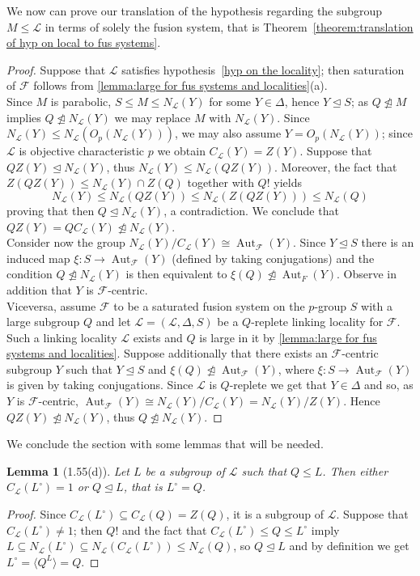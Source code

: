 \documentclass{amsart}
\numberwithin{equation}{section}
\newtheorem{lemma}[equation]{Lemma}
\theoremstyle{definition}
\theoremstyle{subresult}
\theoremstyle{caseresult}
\newcommand{\F}{\mathcal{F}}
\renewcommand{\L}{\mathcal{L}}
\newcommand{\Aut}{\operatorname{Aut}}
\newcommand{\norm}{\trianglelefteq}
\newcommand{\fto}{\longrightarrow}
\newcommand{\<}{\langle}
\renewcommand{\>}{\rangle}
\begin{document}
We now can prove our translation of the hypothesis regarding the subgroup $M \le \L$ in terms of solely the fusion system, that is Theorem~\ref{theorem:translation of hyp on local to fus systems}.
\begin{proof}
	Suppose that $\L$ satisfies hypothesis~\ref{hyp on the locality}; then saturation of $\F$ follows from \ref{lemma:large for fus systems and localities}(a).\\ Since $M$ is parabolic, $S \le M \le N_\L(Y)$ for some $Y \in \Delta$, hence $Y \norm S$; as $Q \not \norm M$ implies $Q \not \norm N_\L(Y)$ we may replace $M$ with $N_\L(Y)$. Since $N_\L(Y) \le N_\L(O_p(N_\L(Y)))$, we may also assume $Y = O_p(N_\L(Y))$; since $\L$ is objective characteristic $p$ we obtain $C_\L(Y) = Z(Y)$. Suppose that $Q Z(Y) \norm N_\L(Y)$, thus $N_\L(Y) \le N_\L(QZ(Y))$. Moreover, the fact that $Z(QZ(Y)) \le N_\L(Y) \cap Z(Q)$ together with $Q!$ yields
		\[
			N_\L(Y) \le N_\L(QZ(Y)) \le N_\L(Z(QZ(Y))) \le N_\L(Q)
		\]
	proving that then $Q \norm N_\L(Y)$, a contradiction. We conclude that $QZ(Y) = QC_\L(Y) \not \norm N_\L(Y)$.\\
	Consider now the group $N_\L(Y) / C_\L(Y) \cong \Aut_\F(Y)$. Since $Y \norm S$ there is an induced map $\xi \colon S \to \Aut_\F(Y)$ (defined by taking conjugations) and the condition $Q \not \norm N_\L(Y)$ is then equivalent to $\xi(Q)\not \norm \Aut_F(Y)$. Observe in addition that $Y$ is $\F$-centric.\\
	
	Viceversa, assume $\F$ to be a saturated fusion system on the $p$-group $S$ with a large subgroup $Q$ and let $\L=(\L,\Delta,S)$ be a $Q$-replete linking locality for $\F$. Such a linking locality $\L$ exists and $Q$ is large in it by \ref{lemma:large for fus systems and localities}. Suppose additionally that there exists an $\F$-centric subgroup $Y$ such that $Y \norm S$ and $\xi(Q) \not \norm \Aut_\F(Y)$, where $\xi \colon S \fto \Aut_\F(Y)$ is given by taking conjugations. Since $\L$ is $Q$-replete we get that $Y \in \Delta$ and so, as $Y$ is $\F$-centric, $\Aut_\F(Y) \cong N_\L(Y)/C_\L(Y) = N_\L(Y) / Z(Y)$. Hence $QZ(Y) \not \norm N_\L(Y)$, thus $Q \not \norm N_\L(Y)$.
\end{proof}

\vspace{1cm}

We conclude the section with some lemmas that will be needed.

\begin{lemma}[1.55(d)]\label{lemma:dichotomy for subgroups containing Q}
	Let $L$ be a subgroup of $\L$ such that $Q \le L$. Then either $C_\L(L^\circ)=1$ or $Q \norm L$, that is $L^\circ = Q$.
\end{lemma}
\begin{proof}
	Since $C_\L(L^\circ) \subseteq C_\L(Q)=Z(Q)$, it is a subgroup of $\L$. Suppose that $C_\L(L^\circ) \ne 1$; then $Q!$ and the fact that $C_\L(L^\circ) \le Q \le L^\circ$ imply $L \subseteq N_\L(L^\circ) \subseteq N_\L(C_\L(L^\circ)) \le N_\L(Q)$, so $Q \norm L$ and by definition we get $L^\circ = \< Q^L \> = Q$.
\end{proof}
\end{document}
